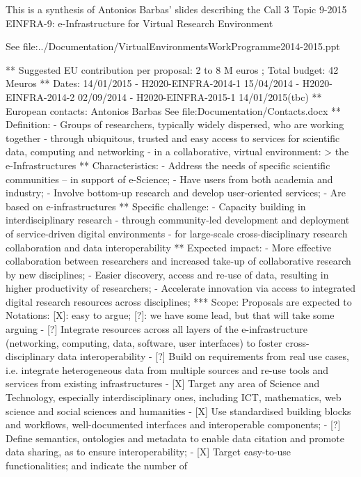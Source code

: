 This is a synthesis of Antonios Barbas' slides describing the Call 3
Topic 9-2015 EINFRA-9: e-Infrastructure for Virtual Research Environment

See file:../Documentation/VirtualEnvironmentsWorkProgramme2014-2015.ppt

** Suggested EU contribution per proposal: 2 to 8 M euros ; Total budget: 42 Meuros
** Dates: 14/01/2015
- H2020-EINFRA-2014-1 15/04/2014
- H2020-EINFRA-2014-2 02/09/2014
- H2020-EINFRA-2015-1 14/01/2015(tbc)
** European contacts: Antonios Barbas
   See file:Documentation/Contacts.docx
** Definition:
- Groups of researchers, typically widely dispersed, who are working
  together
- through ubiquitous, trusted and easy access to services for
  scientific data, computing and networking
- in a collaborative, virtual environment:
  > the e-Infrastructures
** Characteristics:
- Address the needs of specific scientific communities – in support of
  e-Science;
- Have users from both academia and industry;
- Involve bottom-up research and develop user-oriented services;
- Are based on e-infrastructures
** Specific challenge:
- Capacity building in interdisciplinary research
- through community-led development and deployment of service-driven
  digital environments
- for large-scale cross-disciplinary research collaboration and data
  interoperability
** Expected impact:
- More effective collaboration between researchers and increased
  take-up of collaborative research by new disciplines;
- Easier discovery, access and re-use of data, resulting in higher
  productivity of researchers;
- Accelerate innovation via access to integrated digital research
  resources across disciplines;
*** Scope: Proposals are expected to
Notations: [X]: easy to argue; [?]: we have some lead, but that will take some arguing
- [?] Integrate resources across all layers of the e-infrastructure
  (networking, computing, data, software, user interfaces) to foster
  cross-disciplinary data interoperability
- [?] Build on requirements from real use cases, i.e. integrate
  heterogeneous data from multiple sources and re-use tools and
  services from existing infrastructures
- [X] Target any area of Science and Technology, especially
  interdisciplinary ones, including ICT, mathematics, web science and
  social sciences and humanities
- [X] Use standardised building blocks and workflows, well-documented
  interfaces and interoperable components;
- [?] Define semantics, ontologies and metadata to enable data citation
  and promote data sharing, as to ensure interoperability;
- [X] Target easy-to-use functionalities; and indicate the number of
